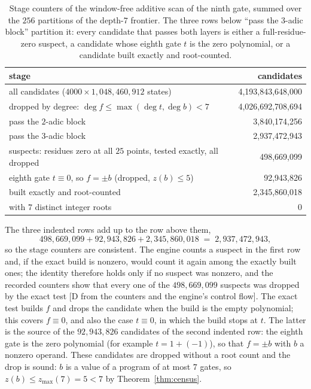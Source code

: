 \documentclass[11pt]{article}
\theoremstyle{definition}
\theoremstyle{remark}
\newcommand{\zmax}{z_{\max}}
\begin{document}
\begin{table}[t]
\centering
\caption{Stage counters of the window-free additive scan of the ninth gate, summed over the
$256$ partitions of the depth-$7$ frontier. The three rows below ``pass the $3$-adic block''
partition it: every candidate that passes both layers is either a full-residue-zero suspect,
a candidate whose eighth gate $t$ is the zero polynomial, or a candidate built exactly and
root-counted.}
\label{tab:funnel}
\begin{tabular}{lr}
\toprule
stage & candidates\\
\midrule
all candidates ($4000 \times 1{,}048{,}460{,}912$ states) & 4{,}193{,}843{,}648{,}000\\
dropped by degree: $\deg f \le \max(\deg t, \deg b) < 7$ & 4{,}026{,}692{,}708{,}694\\
pass the $2$-adic block & 3{,}840{,}174{,}256\\
pass the $3$-adic block & 2{,}937{,}472{,}943\\
\quad suspects: residues zero at all $25$ points, tested exactly, all dropped & 498{,}669{,}099\\
\quad eighth gate $t \equiv 0$, so $f = \pm b$ (dropped, $z(b) \le 5$) & 92{,}943{,}826\\
\quad built exactly and root-counted & 2{,}345{,}860{,}018\\
with $7$ distinct integer roots & 0\\
\bottomrule
\end{tabular}
\end{table}

The three indented rows add up to the row above them,
\[
  498{,}669{,}099 + 92{,}943{,}826 + 2{,}345{,}860{,}018 \;=\; 2{,}937{,}472{,}943 ,
\]
so the stage counters are consistent. The engine
counts a suspect in the first row and, if the exact build is nonzero, would count it again among
the exactly built ones; the identity therefore holds only if no suspect was nonzero, and
the recorded counters show that every one of the $498{,}669{,}099$ suspects was dropped by the
exact test [D from the counters and the engine's control flow]. The exact test builds $f$
and drops the candidate when the build is the empty polynomial; this covers $f \equiv 0$, and
also the case $t \equiv 0$, in which the build stops at $t$. The latter is the source of the
$92{,}943{,}826$ candidates of the second indented row: the eighth gate is the zero polynomial
(for example $t = 1 + (-1)$), so that $f = \pm b$ with $b$ a nonzero operand. These candidates
are dropped without a root count and the drop is sound: $b$ is a value of a program of at
most $7$ gates, so $z(b) \le \zmax(7) = 5 < 7$ by Theorem~\ref{thm:census}.
\end{document}
